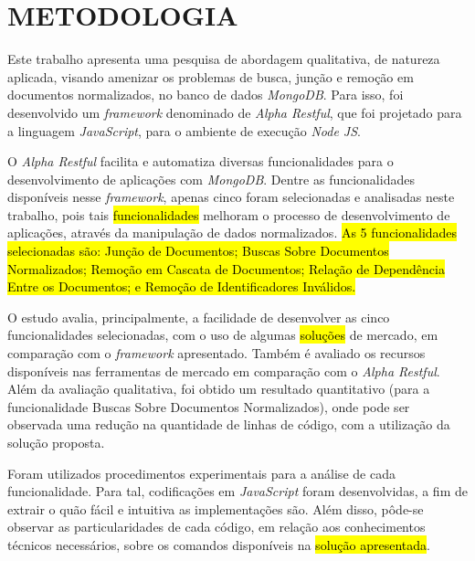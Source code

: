 \chapter{METODOLOGIA}
\label{Metodologia}

Este trabalho apresenta uma pesquisa de abordagem qualitativa, de natureza aplicada, visando amenizar os problemas de busca, junção e remoção em documentos normalizados, no banco de dados \textit{MongoDB}. Para isso, foi desenvolvido um \textit{framework} denominado de \textit{Alpha Restful}, que foi projetado para a linguagem \textit{JavaScript}, para o ambiente de execução \textit{Node JS}.


O \textit{Alpha Restful} facilita e automatiza diversas funcionalidades para o desenvolvimento de aplicações com \textit{MongoDB}. Dentre as funcionalidades disponíveis nesse \textit{framework}, apenas cinco foram selecionadas e analisadas neste trabalho, pois tais \hl{funcionalidades} melhoram o processo de desenvolvimento de aplicações, através da manipulação de dados normalizados. \hl{As 5 funcionalidades selecionadas são: Junção de Documentos; Buscas Sobre Documentos Normalizados; Remoção em Cascata de Documentos; Relação de Dependência Entre os Documentos; e Remoção de Identificadores Inválidos.}

O estudo avalia, principalmente, a facilidade de desenvolver as cinco funcionalidades selecionadas, com o uso de algumas \hl{soluções} de mercado, em comparação com o \textit{framework} apresentado. Também é avaliado os recursos disponíveis nas ferramentas de mercado em comparação com o \textit{Alpha Restful}. Além da avaliação qualitativa, foi obtido um resultado quantitativo (para a funcionalidade Buscas Sobre Documentos Normalizados), onde pode ser observada uma redução na quantidade de linhas de código, com a utilização da solução proposta.

Foram utilizados procedimentos experimentais para a análise de cada funcionalidade. Para tal, codificações em \textit{JavaScript} foram desenvolvidas, a fim de extrair o quão fácil e intuitiva as implementações são. Além disso, pôde-se observar as particularidades de cada código, em relação aos conhecimentos técnicos necessários, sobre os comandos disponíveis na \hl{solução apresentada}.

